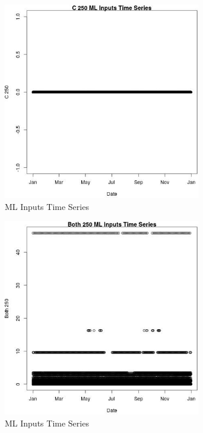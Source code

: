 \begin{figure} 
\centering  
\includegraphics[width=0.77\textwidth]{Code_Outputs/Report_ML_input_PM25_Step4_part_e_de_duplicated_aves_C_250vDate.jpg} 
\caption{\label{fig:Report_ML_input_PM25_Step4_part_e_de_duplicated_avesC_250vDate}ML Inputs Time Series} 
\end{figure} 
 

\clearpage 

\begin{figure} 
\centering  
\includegraphics[width=0.77\textwidth]{Code_Outputs/Report_ML_input_PM25_Step4_part_e_de_duplicated_aves_Both_250vDate.jpg} 
\caption{\label{fig:Report_ML_input_PM25_Step4_part_e_de_duplicated_avesBoth_250vDate}ML Inputs Time Series} 
\end{figure} 
 

